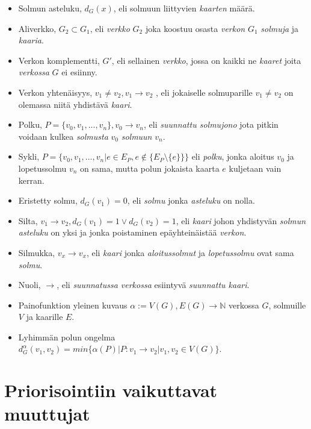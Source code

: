   \begin{itemize}
    \item Solmun asteluku, \(d_G(x)\), eli solmuun liittyvien \emph{kaarten} määrä.
    \item Aliverkko, \(G_2 \subset G_1\), eli \emph{verkko} \(G_2\) joka koostuu osasta \emph{verkon} \(G_1\) \emph{solmuja} ja \emph{kaaria}.
    \item Verkon komplementti, \(G'\), eli sellainen \emph{verkko}, jossa on kaikki ne \emph{kaaret} joita \emph{verkossa} \(G\) ei esiinny.
    \item Verkon yhtenäisyys, \(v_1 \neq v_2, v_1 \rightarrow v_2\) , eli jokaiselle solmuparille \(v_1 \neq v_2\) on olemassa niitä yhdistävä \emph{kaari}.
    \item Polku, \(P = \{v_0, v_1, ..., v_n\}, v_0 \rightarrow v_n\), eli \emph{suunnattu solmujono} jota pitkin voidaan kulkea \emph{solmusta} \(v_0\) \emph{solmuun} \(v_n\).
    \item Sykli, \(P = \{v_0, v_1, ..., v_n| e \in E_P, e \notin \{E_P \setminus \{e\} \}\}\) eli \emph{polku}, jonka aloitus \(v_0\) ja lopetussolmu \(v_n\) on sama, mutta polun jokaista kaarta \(e\) kuljetaan vain kerran.
    \item Eristetty solmu, \(d_G(v_1) = 0\), eli \emph{solmu} jonka \emph{asteluku} on nolla.
    \item Silta, \(v_1 \rightarrow v_2, d_G(v_1) = 1 \lor d_G(v_2) = 1\), eli \emph{kaari} johon yhdistyvän \emph{solmun asteluku} on yksi ja jonka poistaminen epäyhteinäistää \emph{verkon}.
    \item Silmukka, \(v_x \rightarrow v_x\), eli \emph{kaari} jonka \emph{aloitussolmut} ja \emph{lopetussolmu} ovat sama \emph{solmu}.
    \item Nuoli, \(\rightarrow\), eli \emph{suunnatussa verkossa} esiintyvä \emph{suunnattu kaari}.
    \item Painofunktion yleinen kuvaus \(\alpha := V(G), E(G) \rightarrow \mathbb{N}\) verkossa \(G\), solmuille \(V\) ja kaarille \(E\).
    \item Lyhimmän polun ongelma \(d_G^\alpha(v_1, v_2) = min\{\alpha(P) | P:v_1 \rightarrow v_2 | v_1, v_2 \in V(G)\}\).
  \end{itemize}

\section{Priorisointiin vaikuttavat muuttujat} \label{ch:10_priorisointiin_vaikuttavat_muuttujat}

